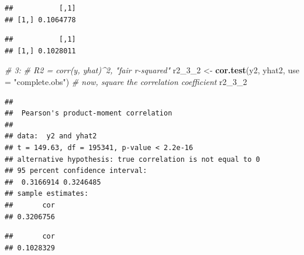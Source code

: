 \documentclass[
]{article}
\newenvironment{Shaded}{\begin{snugshade}}{\end{snugshade}}
\newcommand{\CommentTok}[1]{\textcolor[rgb]{0.56,0.35,0.01}{\textit{#1}}}
\newcommand{\DataTypeTok}[1]{\textcolor[rgb]{0.13,0.29,0.53}{#1}}
\newcommand{\DecValTok}[1]{\textcolor[rgb]{0.00,0.00,0.81}{#1}}
\newcommand{\KeywordTok}[1]{\textcolor[rgb]{0.13,0.29,0.53}{\textbf{#1}}}
\newcommand{\NormalTok}[1]{#1}
\newcommand{\OperatorTok}[1]{\textcolor[rgb]{0.81,0.36,0.00}{\textbf{#1}}}
\newcommand{\StringTok}[1]{\textcolor[rgb]{0.31,0.60,0.02}{#1}}
\begin{document}
\begin{verbatim}
##           [,1]
## [1,] 0.1064778
\end{verbatim}

\begin{Shaded}
\end{Shaded}

\begin{verbatim}
##           [,1]
## [1,] 0.1028011
\end{verbatim}

\begin{Shaded}
\begin{Highlighting}[]
\CommentTok{# 3:}
\CommentTok{# R2 = corr(y, yhat)^2, "fair r-squared"}
\NormalTok{r2_}\DecValTok{3}\NormalTok{_}\DecValTok{2}\NormalTok{ <-}\StringTok{ }\KeywordTok{cor.test}\NormalTok{(y2, yhat2, }\DataTypeTok{use =} \StringTok{"complete.obs"}\NormalTok{)}
\CommentTok{# now, square the correlation coefficient}
\NormalTok{r2_}\DecValTok{3}\NormalTok{_}\DecValTok{2}
\end{Highlighting}
\end{Shaded}

\begin{verbatim}
## 
##  Pearson's product-moment correlation
## 
## data:  y2 and yhat2
## t = 149.63, df = 195341, p-value < 2.2e-16
## alternative hypothesis: true correlation is not equal to 0
## 95 percent confidence interval:
##  0.3166914 0.3246485
## sample estimates:
##       cor 
## 0.3206756
\end{verbatim}

\begin{Shaded}
\end{Shaded}

\begin{verbatim}
##       cor 
## 0.1028329
\end{verbatim}
\end{document}
